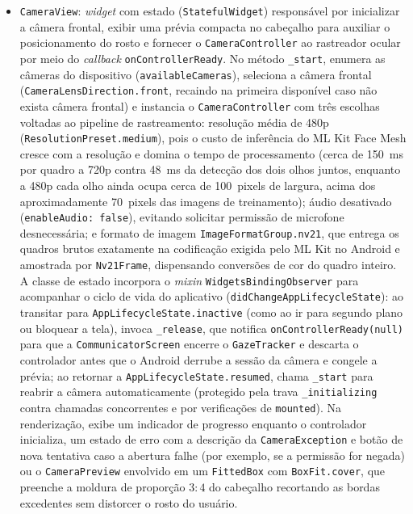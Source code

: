 \begin{itemize}
    \item \texttt{CameraView}: \textit{widget} com estado (\texttt{StatefulWidget}) responsável por inicializar a câmera frontal, exibir uma prévia compacta no cabeçalho para auxiliar o posicionamento do rosto e fornecer o \texttt{CameraController} ao rastreador ocular por meio do \textit{callback} \texttt{onControllerReady}. No método \texttt{\_start}, enumera as câmeras do dispositivo (\texttt{availableCameras}), seleciona a câmera frontal (\texttt{CameraLensDirection.\allowbreak front}, recaindo na primeira disponível caso não exista câmera frontal) e instancia o \texttt{CameraController} com três escolhas voltadas ao pipeline de rastreamento: resolução média de 480p (\texttt{ResolutionPreset.\allowbreak medium}), pois o custo de inferência do ML Kit Face Mesh cresce com a resolução e domina o tempo de processamento (cerca de 150~ms por quadro a 720p contra 48~ms da detecção dos dois olhos juntos, enquanto a 480p cada olho ainda ocupa cerca de 100~pixels de largura, acima dos aproximadamente 70~pixels das imagens de treinamento); áudio desativado (\texttt{enableAudio: false}), evitando solicitar permissão de microfone desnecessária; e formato de imagem \texttt{ImageFormatGroup.\allowbreak nv21}, que entrega os quadros brutos exatamente na codificação exigida pelo ML Kit no Android e amostrada por \texttt{Nv21Frame}, dispensando conversões de cor do quadro inteiro. A classe de estado incorpora o \textit{mixin} \texttt{WidgetsBindingObserver} para acompanhar o ciclo de vida do aplicativo (\texttt{didChangeAppLifecycleState}): ao transitar para \texttt{AppLifecycleState.\allowbreak inactive} (como ao ir para segundo plano ou bloquear a tela), invoca \texttt{\_release}, que notifica \texttt{onControllerReady(null)} para que a \texttt{CommunicatorScreen} encerre o \texttt{GazeTracker} e descarta o controlador antes que o Android derrube a sessão da câmera e congele a prévia; ao retornar a \texttt{AppLifecycleState.\allowbreak resumed}, chama \texttt{\_start} para reabrir a câmera automaticamente (protegido pela trava \texttt{\_initializing} contra chamadas concorrentes e por verificações de \texttt{mounted}). Na renderização, exibe um indicador de progresso enquanto o controlador inicializa, um estado de erro com a descrição da \texttt{CameraException} e botão de nova tentativa caso a abertura falhe (por exemplo, se a permissão for negada) ou o \texttt{CameraPreview} envolvido em um \texttt{FittedBox} com \texttt{BoxFit.cover}, que preenche a moldura de proporção $3:4$ do cabeçalho recortando as bordas excedentes sem distorcer o rosto do usuário.
\end{itemize}

